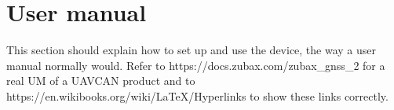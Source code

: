\section{User manual}

This section should explain how to set up and use the device, the way a user manual normally would.
Refer to https://docs.zubax.com/zubax_gnss_2 for a real UM of a UAVCAN product and to https://en.wikibooks.org/wiki/LaTeX/Hyperlinks to show these links correctly.